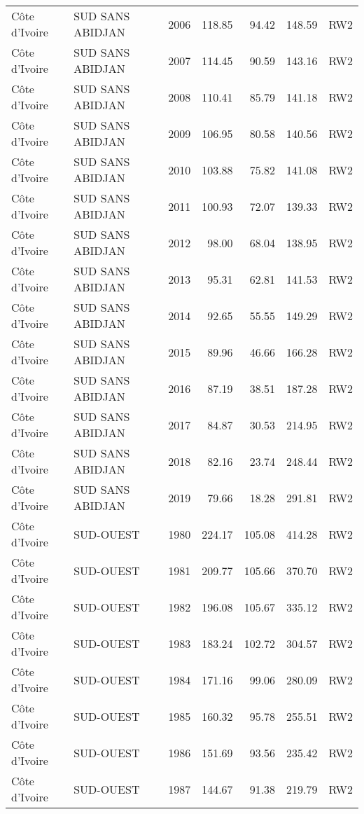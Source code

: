 \begin{longtable}{lllrrrl}
  C\^{o}te d'Ivoire & SUD SANS ABIDJAN & 2006 & 118.85 & 94.42 & 148.59 & RW2 \\ 
  C\^{o}te d'Ivoire & SUD SANS ABIDJAN & 2007 & 114.45 & 90.59 & 143.16 & RW2 \\ 
  C\^{o}te d'Ivoire & SUD SANS ABIDJAN & 2008 & 110.41 & 85.79 & 141.18 & RW2 \\ 
  C\^{o}te d'Ivoire & SUD SANS ABIDJAN & 2009 & 106.95 & 80.58 & 140.56 & RW2 \\ 
  C\^{o}te d'Ivoire & SUD SANS ABIDJAN & 2010 & 103.88 & 75.82 & 141.08 & RW2 \\ 
  C\^{o}te d'Ivoire & SUD SANS ABIDJAN & 2011 & 100.93 & 72.07 & 139.33 & RW2 \\ 
  C\^{o}te d'Ivoire & SUD SANS ABIDJAN & 2012 & 98.00 & 68.04 & 138.95 & RW2 \\ 
  C\^{o}te d'Ivoire & SUD SANS ABIDJAN & 2013 & 95.31 & 62.81 & 141.53 & RW2 \\ 
  C\^{o}te d'Ivoire & SUD SANS ABIDJAN & 2014 & 92.65 & 55.55 & 149.29 & RW2 \\ 
  C\^{o}te d'Ivoire & SUD SANS ABIDJAN & 2015 & 89.96 & 46.66 & 166.28 & RW2 \\ 
  C\^{o}te d'Ivoire & SUD SANS ABIDJAN & 2016 & 87.19 & 38.51 & 187.28 & RW2 \\ 
  C\^{o}te d'Ivoire & SUD SANS ABIDJAN & 2017 & 84.87 & 30.53 & 214.95 & RW2 \\ 
  C\^{o}te d'Ivoire & SUD SANS ABIDJAN & 2018 & 82.16 & 23.74 & 248.44 & RW2 \\ 
  C\^{o}te d'Ivoire & SUD SANS ABIDJAN & 2019 & 79.66 & 18.28 & 291.81 & RW2 \\ 
  C\^{o}te d'Ivoire & SUD-OUEST & 1980 & 224.17 & 105.08 & 414.28 & RW2 \\ 
  C\^{o}te d'Ivoire & SUD-OUEST & 1981 & 209.77 & 105.66 & 370.70 & RW2 \\ 
  C\^{o}te d'Ivoire & SUD-OUEST & 1982 & 196.08 & 105.67 & 335.12 & RW2 \\ 
  C\^{o}te d'Ivoire & SUD-OUEST & 1983 & 183.24 & 102.72 & 304.57 & RW2 \\ 
  C\^{o}te d'Ivoire & SUD-OUEST & 1984 & 171.16 & 99.06 & 280.09 & RW2 \\ 
  C\^{o}te d'Ivoire & SUD-OUEST & 1985 & 160.32 & 95.78 & 255.51 & RW2 \\ 
  C\^{o}te d'Ivoire & SUD-OUEST & 1986 & 151.69 & 93.56 & 235.42 & RW2 \\ 
  C\^{o}te d'Ivoire & SUD-OUEST & 1987 & 144.67 & 91.38 & 219.79 & RW2 \\ 

\end{longtable}
